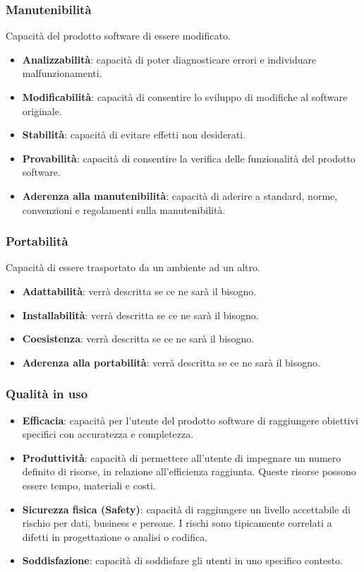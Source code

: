 \subsubsection{Manutenibilità}
Capacità del prodotto software di essere modificato.
\begin{itemize}
\item \textbf{Analizzabilità}: capacità di poter diagnosticare errori e individuare malfunzionamenti.
\item \textbf{Modificabilità}: capacità di consentire lo sviluppo di modifiche al software originale.
\item \textbf{Stabilità}: capacità di evitare effetti non desiderati.
\item \textbf{Provabilità}: capacità di consentire la verifica delle funzionalità del prodotto software.
\item \textbf{Aderenza alla manutenibilità}: capacità di aderire a standard, norme, convenzioni e regolamenti sulla manutenibilità.
\end{itemize}

\subsubsection{Portabilità}
Capacità di essere trasportato da un ambiente ad un altro.
\begin{itemize}
\item \textbf{Adattabilità}: verrà descritta se ce ne sarà il bisogno.
\item \textbf{Installabilità}: verrà descritta se ce ne sarà il bisogno.
\item \textbf{Coesistenza}: verrà descritta se ce ne sarà il bisogno.
\item \textbf{Aderenza alla portabilità}: verrà descritta se ce ne sarà il bisogno.
\end{itemize}

\subsubsection{Qualità in uso}
\begin{itemize}
\item \textbf{Efficacia}: capacità per l’utente del prodotto software di raggiungere obiettivi specifici con accuratezza e completezza.
\item \textbf{Produttività}: capacità di permettere all’utente di impegnare un numero definito di risorse, in relazione all’efficienza raggiunta. Queste risorse possono essere tempo, materiali e costi.
\item \textbf{Sicurezza fisica (Safety)}: capacità di raggiungere un livello accettabile di rischio per dati, business e persone. I rischi sono tipicamente correlati a difetti in progettazione o analisi o codifica.
\item \textbf{Soddisfazione}: capacità di soddisfare gli utenti in uno specifico contesto.
\end{itemize}
